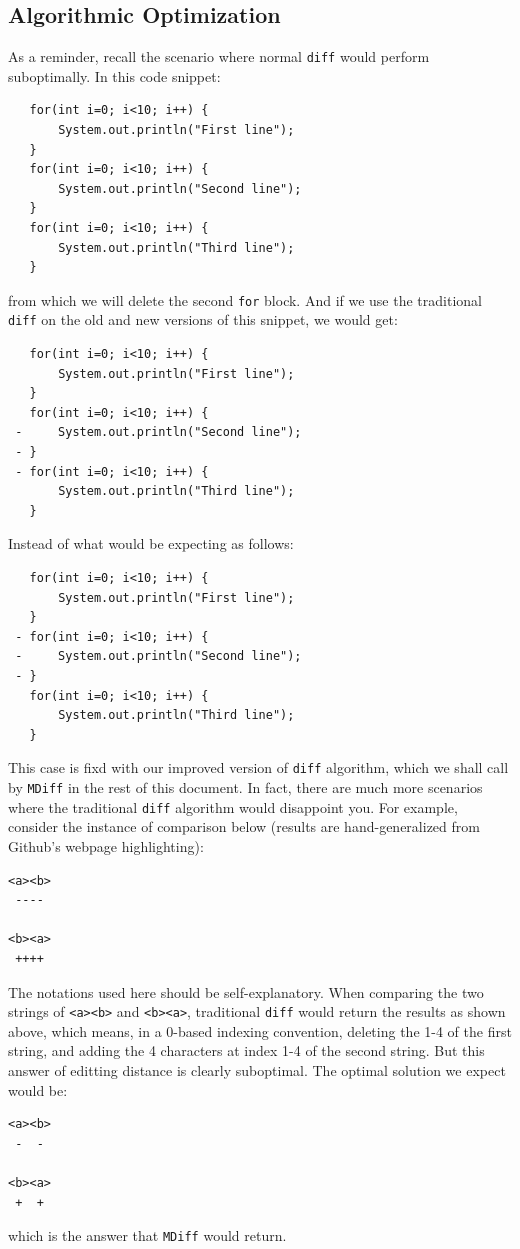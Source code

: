 \documentclass{article}
\begin{document}
\subsection{Algorithmic Optimization}
As a reminder, recall the scenario where normal \texttt{diff} would perform suboptimally. In this code snippet:\\
\begin{lstlisting}
   for(int i=0; i<10; i++) {
       System.out.println("First line");
   }
   for(int i=0; i<10; i++) {
       System.out.println("Second line");
   }
   for(int i=0; i<10; i++) {
       System.out.println("Third line");
   }
\end{lstlisting}
from which we will delete the second \texttt{for} block. And if we use the traditional \texttt{diff} on the old and new versions of this snippet, we would get:\\
\begin{lstlisting}
   for(int i=0; i<10; i++) {
       System.out.println("First line");
   }
   for(int i=0; i<10; i++) {
 -     System.out.println("Second line");
 - }
 - for(int i=0; i<10; i++) {
       System.out.println("Third line");
   }
\end{lstlisting}
Instead of what would be expecting as follows:
\begin{lstlisting}
   for(int i=0; i<10; i++) {
       System.out.println("First line");
   }
 - for(int i=0; i<10; i++) {
 -     System.out.println("Second line");
 - }
   for(int i=0; i<10; i++) {
       System.out.println("Third line");
   }
\end{lstlisting}
This case is fixd with our improved version of \texttt{diff} algorithm, which we shall call by \texttt{MDiff} in the rest of this document. In fact, there are much more scenarios where the traditional \texttt{diff} algorithm would disappoint you. For example, consider the instance of comparison below (results are hand-generalized from Github's webpage highlighting):
\begin{lstlisting}
<a><b>
 ----

<b><a>
 ++++
\end{lstlisting}
The notations used here should be self-explanatory. When comparing the two strings of \texttt{<a><b>} and \texttt{<b><a>}, traditional \texttt{diff} would return the results as shown above, which means, in a 0-based indexing convention, deleting the 1-4 of the first string, and adding the 4 characters at index 1-4 of the second string. But this answer of editting distance is clearly suboptimal. The optimal solution we expect would be:
\begin{lstlisting}
<a><b>
 -  -

<b><a>
 +  +
\end{lstlisting}
which is the answer that \texttt{MDiff} would return.
\end{document}
